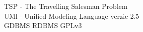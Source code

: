 TSP - The Travelling Salesman Problem\\
UMl - Unified Modeling Language verzie 2.5\\
GDBMS
RDBMS
GPLv3
